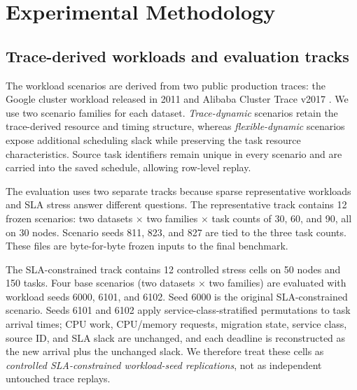 \documentclass[preprint,12pt]{elsarticle}
\begin{document}
\section{Experimental Methodology}
\label{sec:experimental}

\subsection{Trace-derived workloads and evaluation tracks}

The workload scenarios are derived from two public production traces: the Google cluster workload released in 2011 and Alibaba Cluster Trace v2017 \cite{reiss2012google,cheng2018alibaba,shahmirzadi2024analyzing}. We use two scenario families for each dataset. \emph{Trace-dynamic} scenarios retain the trace-derived resource and timing structure, whereas \emph{flexible-dynamic} scenarios expose additional scheduling slack while preserving the task resource characteristics. Source task identifiers remain unique in every scenario and are carried into the saved schedule, allowing row-level replay.

The evaluation uses two separate tracks because sparse representative workloads and SLA stress answer different questions. The representative track contains 12 frozen scenarios: two datasets $\times$ two families $\times$ task counts of 30, 60, and 90, all on 30 nodes. Scenario seeds 811, 823, and 827 are tied to the three task counts. These files are byte-for-byte frozen inputs to the final benchmark.

The SLA-constrained track contains 12 controlled stress cells on 50 nodes and 150 tasks. Four base scenarios (two datasets $\times$ two families) are evaluated with workload seeds 6000, 6101, and 6102. Seed 6000 is the original SLA-constrained scenario. Seeds 6101 and 6102 apply service-class-stratified permutations to task arrival times; CPU work, CPU/memory requests, migration state, service class, source ID, and SLA slack are unchanged, and each deadline is reconstructed as the new arrival plus the unchanged slack. We therefore treat these cells as \emph{controlled SLA-constrained workload-seed replications}, not as independent untouched trace replays.
\end{document}
